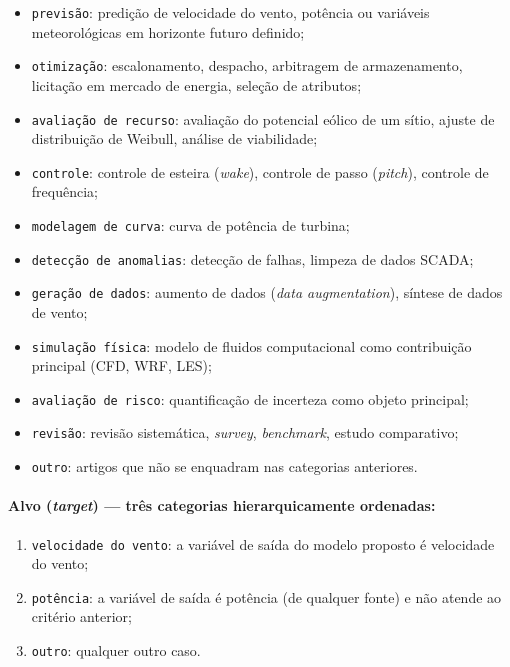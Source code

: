 \begin{itemize}
  \item \texttt{previsão}: predição de velocidade do vento, potência
        ou variáveis meteorológicas em horizonte futuro definido;
  \item \texttt{otimização}: escalonamento, despacho, arbitragem de
        armazenamento, licitação em mercado de energia, seleção de
        atributos;
  \item \texttt{avaliação de recurso}: avaliação do potencial eólico
        de um sítio, ajuste de distribuição de Weibull, análise de
        viabilidade;
  \item \texttt{controle}: controle de esteira (\textit{wake}),
        controle de passo (\textit{pitch}), controle de frequência;
  \item \texttt{modelagem de curva}: curva de potência de turbina;
  \item \texttt{detecção de anomalias}: detecção de falhas, limpeza
        de dados SCADA;
  \item \texttt{geração de dados}: aumento de dados
        (\textit{data augmentation}), síntese de dados de vento;
  \item \texttt{simulação física}: modelo de fluidos computacional
        como contribuição principal (CFD, WRF, LES);
  \item \texttt{avaliação de risco}: quantificação de incerteza como
        objeto principal;
  \item \texttt{revisão}: revisão sistemática, \textit{survey},
        \textit{benchmark}, estudo comparativo;
  \item \texttt{outro}: artigos que não se enquadram nas categorias
        anteriores.
\end{itemize}

\paragraph{Alvo (\textit{target}) — três categorias hierarquicamente
ordenadas:}

\begin{enumerate}
  \item \texttt{velocidade do vento}: a variável de saída do modelo
        proposto é velocidade do vento;
  \item \texttt{potência}: a variável de saída é potência (de
        qualquer fonte) e não atende ao critério anterior;
  \item \texttt{outro}: qualquer outro caso.
\end{enumerate}

